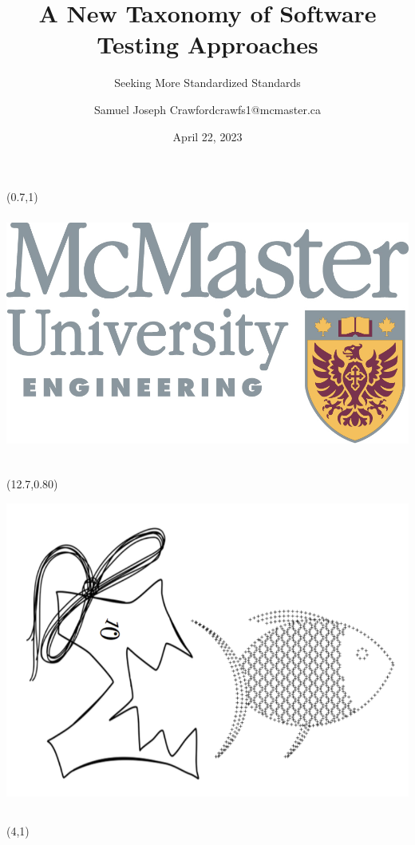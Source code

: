\documentclass[22pt]{beamer}
\title{A New Taxonomy of Software Testing Approaches}
\subtitle{Seeking More Standardized Standards}
\author[Crawford]{Samuel Joseph Crawford\newline \small crawfs1@mcmaster.ca} %
\institute[McMaster University]{Department of Computing and Software, McMaster University} %
\date{April 22, 2023}
\begin{document}

\begin{frame}[fragile]

    \begin{textblock}{2}(0.7,1)
        \includegraphics[height=8.5cm]{figs/eng_logo.png} %
    \end{textblock}

    \begin{textblock}{2}(12.7,0.80)
        \includegraphics[height=10.5cm]{figs/outreachlogo.png}
    \end{textblock}

    \begin{textblock}{8}(4,1)
        \titlepage
    \end{textblock}


\end{frame}
\end{document}
